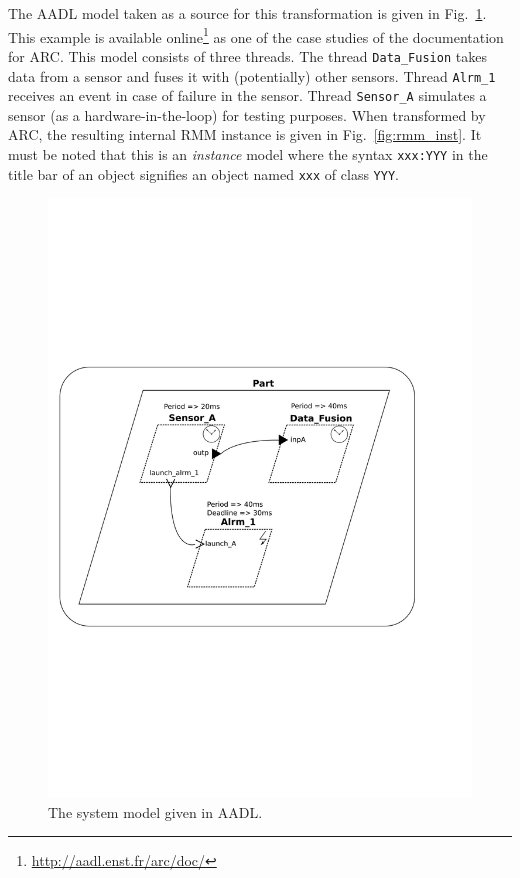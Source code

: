 The AADL model taken as a source for this transformation is given in
Fig.~\ref{fig:example}. This example is available
online\footnote{\url{http://aadl.enst.fr/arc/doc/}} as one of the case
studies of the documentation for ARC. This model consists of three
threads. The thread \texttt{Data\_Fusion} takes data from a sensor and
fuses it with (potentially) other sensors. Thread \texttt{Alrm\_1}
receives an event in case of failure in the sensor. Thread
\texttt{Sensor\_A} simulates a sensor (as a hardware-in-the-loop) for
testing purposes. When transformed by ARC, the resulting internal RMM
instance is given in Fig.~\ref{fig:rmm_inst}. It must be noted that
this is an \emph{instance} model where the syntax \texttt{xxx:YYY} in
the title bar of an object signifies an object named \texttt{xxx} of
class \texttt{YYY}.

\begin{figure}
\centering
\includegraphics[scale=0.60]{figs/example}
\caption{The system model given in AADL.}
\label{fig:example}
\end{figure}

